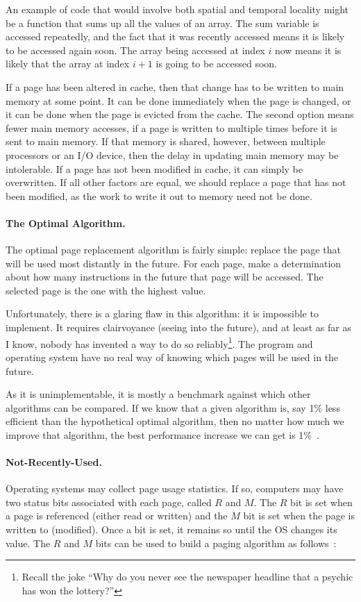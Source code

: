 An example of code that would involve both spatial and temporal locality might be a function that sums up all the values of an array. The sum variable is accessed repeatedly, and the fact that it was recently accessed means it is likely to be accessed again soon. The array being accessed at index $i$ now means it is likely that the array at index $i+1$ is going to be accessed soon.

If a page has been altered in cache, then that change has to be written to main memory at some point. It can be done immediately when the page is changed, or it can be done when the page is evicted from the cache. The second option means fewer main memory accesses, if a page is written to multiple times before it is sent to main memory. If that memory is shared, however, between multiple processors or an I/O device, then the delay in updating main memory may be intolerable. If a page has not been modified in cache, it can simply be overwritten. If all other factors are equal, we should replace a page that has not been modified, as the work to write it out to memory need not be done.

\paragraph{The Optimal Algorithm.}
The optimal page replacement algorithm is fairly simple: replace the page that will be used most distantly in the future. For each page, make a determination about how many instructions in the future that page will be accessed. The selected page is the one with the highest value.

Unfortunately, there is a glaring flaw in this algorithm: it is impossible to implement. It requires clairvoyance (seeing into the future), and at least as far as I know, nobody has invented a way to do so reliably\footnote{Recall the joke ``Why do you never see the newspaper headline that a psychic has won the lottery?''}. The program and operating system have no real way of knowing which pages will be used in the future.

As it is unimplementable, it is mostly a benchmark against which other algorithms can be compared. If we know that a given algorithm is, say 1\% less efficient than the hypothetical optimal algorithm, then no matter how much we improve that algorithm, the best performance increase we can get is 1\%~\cite{mos}.

\paragraph{Not-Recently-Used.}
Operating systems may collect page usage statistics. If so, computers may have two status bits associated with each page, called $R$ and $M$. The $R$ bit is set when a page is referenced (either read or written) and the $M$ bit is set when the page is written to (modified). Once a bit is set, it remains so until the OS changes its value. The $R$ and $M$ bits can be used to build a paging algorithm as follows~\cite{mos}:

